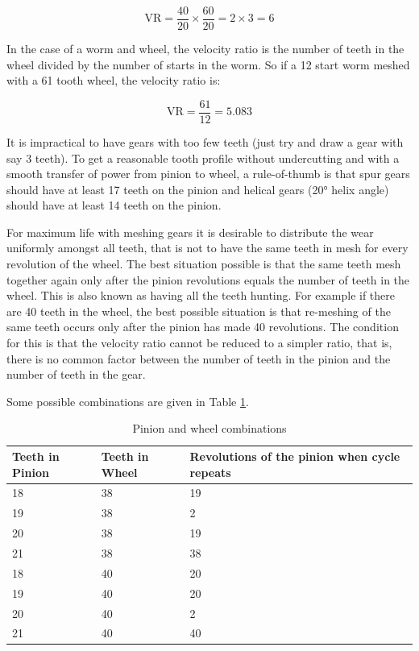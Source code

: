 \begin{equation}
  \text{VR} = \frac{40}{20} \times \frac{60}{20} = 2 \times 3 = 6
\end{equation}

In the case of a worm and wheel, the velocity ratio is the number of teeth in the wheel divided by the number of starts in the worm. So if a 12 start worm meshed with a 61 tooth wheel, the velocity ratio is:

\begin{equation}
  \text{VR} = \frac{61}{12} = 5.083
\end{equation}

It is impractical to have gears with too few teeth (just try and draw a gear with say 3 teeth). To get a reasonable tooth profile without undercutting and with a smooth transfer of power from pinion to wheel, a rule-of-thumb is that spur gears should have at least 17 teeth on the pinion and helical gears (\ang{20} helix angle) should have at least 14 teeth on the pinion.

For maximum life with meshing gears it is desirable to distribute the wear uniformly amongst all teeth, that is not to have the same teeth in mesh for every revolution of the wheel. The best situation possible is that the same teeth mesh together again only after the pinion revolutions equals the number of teeth in the wheel. This is also known as having all the teeth hunting. For example if there are 40 teeth in the wheel, the best possible situation is that re-meshing of the same teeth occurs only after the pinion has made 40 revolutions. The condition for this is that the velocity ratio cannot be reduced to a simpler ratio, that is, there is no common factor between the number of teeth in the pinion and the number of teeth in the gear.

Some possible combinations are given in Table \ref{tbl-1}.

\begin{table}
  \caption{Pinion and wheel combinations}
  \label{tbl-1}
  \center
  \begin{tabular}{p{} p{} p{}}
    \toprule
    Teeth in Pinion & Teeth in Wheel & Revolutions of the pinion when cycle repeats \\
    \midrule
    18 & 38 & 19 \\
    19 & 38 & 2 \\
    20 & 38 & 19 \\
    21 & 38 & 38 \\
    18 & 40 & 20 \\
    19 & 40 & 20 \\
    20 & 40 & 2 \\
    21 & 40 & 40 \\
    \bottomrule
  \end{tabular}
\end{table}

